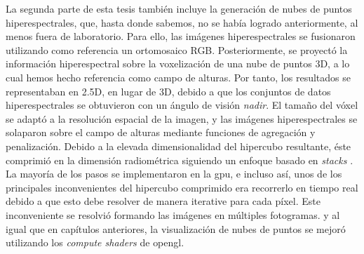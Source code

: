 La segunda parte de esta tesis también incluye la generación de nubes de puntos hiperespectrales, que, hasta donde sabemos, no se había logrado anteriormente, al menos fuera de laboratorio. Para ello, las imágenes hiperespectrales se fusionaron utilizando como referencia un ortomosaico RGB. Posteriormente, se proyectó la información hiperespectral sobre la voxelización de una nube de puntos 3D, a lo cual hemos hecho referencia como campo de alturas. Por tanto, los resultados se representaban en 2.5D, en lugar de 3D, debido a que los conjuntos de datos hiperespectrales se obtuvieron con un ángulo de visión \textit{nadir}. El tamaño del vóxel se adaptó a la resolución espacial de la imagen, y las imágenes hiperespectrales se solaparon sobre el campo de alturas mediante funciones de agregación y penalización. Debido a la elevada dimensionalidad del hipercubo resultante, éste comprimió en la dimensión radiométrica siguiendo un enfoque basado en \textit{stacks} \cite{graciano_quadstack_2021}. La mayoría de los pasos se implementaron en la \acrshort{gpu}, e incluso así, unos de los principales inconvenientes del hipercubo comprimido era recorrerlo en tiempo real debido a que esto debe resolver de manera iterative para cada píxel. Este inconveniente se resolvió formando las imágenes en múltiples fotogramas. y al igual que en capítulos anteriores, la visualización de nubes de puntos se mejoró utilizando los \textit{compute shaders} de \acrshort{opengl}.

